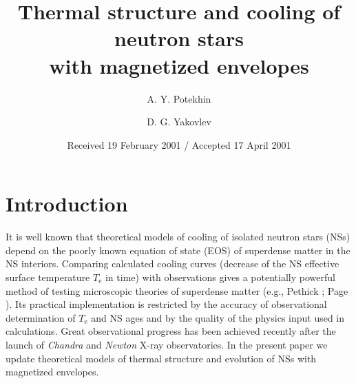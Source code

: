 \documentclass{aa}
\begin{document}
\title{Thermal structure and cooling of neutron stars \\
         with  magnetized envelopes}
         

\author{A. Y. Potekhin
\and
 D. G. Yakovlev}



\date{Received 19 February 2001 / Accepted 17 April 2001}
\maketitle

\section{Introduction}
\label{sect-intro}
%
It is well known that theoretical models of
cooling of isolated neutron stars (NSs) depend on the
poorly known equation of state (EOS) of
superdense matter in the NS
interiors. Comparing calculated cooling curves
(decrease of the NS effective surface
temperature $T_\mathrm{e}$ in time) with observations
gives a potentially powerful method of testing microscopic theories
of superdense matter
(e.g., Pethick \cite{pethick}; Page \cite{page97,page98}).
Its practical implementation is restricted by
the accuracy of observational determination of $T_\mathrm{e}$
and NS ages and by the quality of the physics input
used in calculations. Great observational
progress has been achieved recently
after the launch of \emph{Chandra} and \emph{Newton} X-ray observatories.
In the present paper we update
theoretical models of thermal structure
and evolution of NSs with magnetized envelopes.
\end{document}
